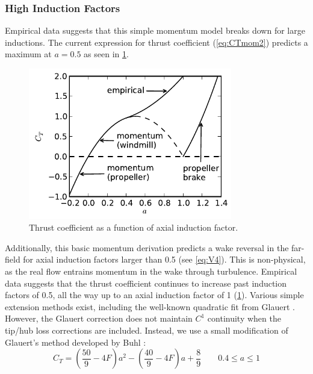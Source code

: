 \documentclass{article}
\begin{document}
\subsubsection{High Induction Factors}

Empirical data suggests that this simple momentum model breaks down for large inductions.  The current expression for thrust coefficient (\cref{eq:CTmom2}) predicts a maximum at $a = 0.5$ as seen in \cref{fig:a}.  

\begin{figure}[htbp]
\centering
\includegraphics[width=3.5in]{figures/a}
\caption{Thrust coefficient as a function of axial induction factor.}
\label{fig:a}
\end{figure}

Additionally, this basic momentum derivation predicts a wake reversal in the far-field for axial induction factors larger than 0.5 (see \cref{eq:V4}).  This is non-physical, as the real flow entrains momentum in the wake through turbulence.  Empirical data suggests that the thrust coefficient continues to increase past induction factors of 0.5, all the way up to an axial induction factor of 1 (\cref{fig:a}).  Various simple extension methods exist, including the well-known quadratic fit from Glauert \cite{Glauert1926}.  However, the Glauert correction does not maintain $C^1$ continuity when the tip/hub loss corrections are included.  Instead, we use a small modification of Glauert's method developed by Buhl \cite{Buhl-Jr.2005}:
\begin{equation}
C_T = \left(\frac{50}{9} - 4F\right) a^2 - \left(\frac{40}{9} - 4F\right) a + \frac{8}{9} \qquad  0.4 \le a \le 1
\label{eq:CTBuhl}
\end{equation}
 
\end{document}
